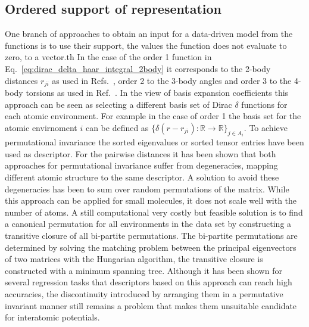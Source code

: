 \subsection{Ordered support of representation}
One branch of approaches to obtain an input for a data-driven model from the functions is to use their support, the values the function does not evaluate to zero, to a vector.th
In the case of the order 1 function in Eq.~\ref{eq:dirac_delta_haar_integral_2body} it corresponds to the 2-body distances $r_{ji}$ as used in Refs.~\cite{rupp2012fast, montavon2012learning, montavon2013machine, sadeghi2013metrics}, order 2 to the 3-body angles and order 3 to the 4-body torsions as used in Ref.~\cite{huang2016communication}.
In the view of basis expansion coefficients this approach can be seen as selecting a different basis set of Dirac $\delta$ functions for each atomic environment.
For example in the case of order 1 the basis set for the atomic envirnoment $i$ can be defined as $\{\delta(r-r_{ji}):\mathbb{R}\rightarrow\mathbb{R}\}_{j\in A_i}$.
To achieve permutational invariance the sorted eigenvalues\cite{rupp2012fast, sadeghi2013metrics, zhu2016fingerprint} or sorted tensor entries\cite{hansen2015machine, barker2016localized, huang2016communication} have been used as descriptor.
For the pairwise distances it has been shown that both approaches for permutational invariance suffer from degeneracies, mapping different atomic structure to the same descriptor\cite{moussa2012comment}.
A solution to avoid these degeneracies has been to sum over random permutations of the matrix\cite{montavon2012learning, montavon2013machine, sadeghi2013metrics}.
While this approach can be applied for small molecules, it does not scale well with the number of atoms.
A still computational very costly but feasible solution is to find a canonical permutation for all environments in the data set by constructing a transitive closure of all bi-partite permutations\cite{chmiela2018towards}. The bi-partite permutations are determined by solving the matching problem between the principal eigenvectors of two matrices with the Hungarian algorithm\cite{kuhn1955hungarian}, the transitive closure is constructed with a minimum spanning tree.
Although it has been shown for several regression tasks that descriptors based on this approach can reach high accuracies\cite{barker2016localized,huang2016communication}, the discontinuity introduced by arranging them in a permutative invariant manner still remains a problem that makes them unsuitable candidate for interatomic potentials.

